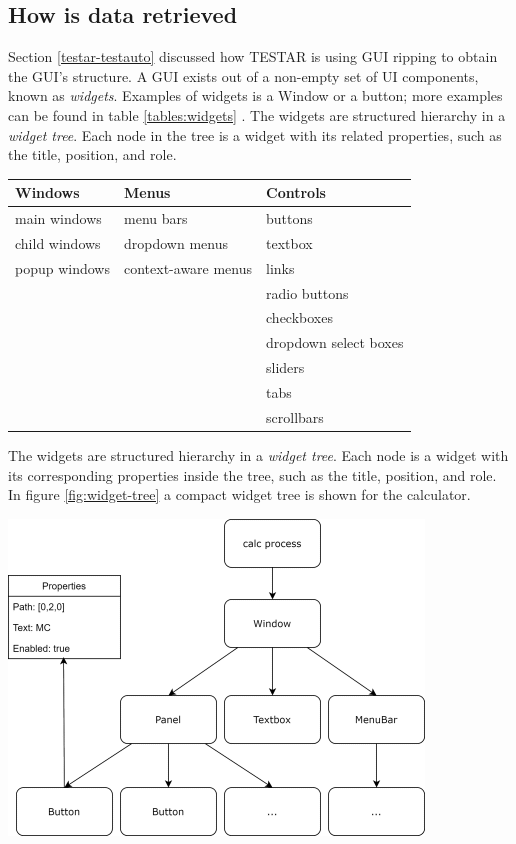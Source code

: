 \subsection{How is data retrieved} \label{data-retrieval}

Section \ref{testar-testauto} discussed how TESTAR is using GUI ripping to obtain the GUI's structure. A GUI exists out of a non-empty set of UI components, known as \emph{widgets}. Examples of widgets is a Window or a button; more examples can be found in table \ref{tables:widgets} \cite{VosAho2021}. The widgets are structured hierarchy in a \emph{widget tree}. Each node in the tree is a widget with its related properties, such as the title, position, and role.

\begingroup
\captionsetup{type=table}
\begin{tabularx}{\textwidth}{ 
  | >{\raggedright\arraybackslash}X 
  | >{\raggedright\arraybackslash}X 
  | >{\raggedright\arraybackslash}X | }
    \hline
    Windows & Menus & Controls \\
    \hline
    \hline
    main windows & menu bars & buttons \\
    child windows & dropdown menus & textbox \\
    popup windows & context-aware menus & links \\
    && radio buttons \\
    && checkboxes\\
    && dropdown select boxes\\
    && sliders\\
    && tabs\\
    && scrollbars \\
    \hline
\end{tabularx}
\label{tables:widgets}
\endgroup

 The widgets are structured hierarchy in a \emph{widget tree}. Each node is a widget with its corresponding properties inside the tree, such as the title, position, and role. In figure \ref{fig:widget-tree} a compact widget tree is shown for the calculator. 

\begingroup
\captionsetup{type=figure}
\includegraphics{pics/calc-tree.png}
\label{fig:widget-tree}
\endgroup

